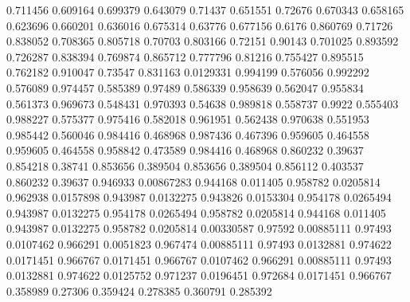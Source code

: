 0.711456 0.609164
0.699379 0.643079
0.71437 0.651551
0.72676 0.670343
0.658165 0.623696
0.660201 0.636016
0.675314 0.63776
0.677156 0.6176
0.860769 0.71726
0.838052 0.708365
0.805718 0.70703
0.803166 0.72151
0.90143 0.701025
0.893592 0.726287
0.838394 0.769874
0.865712 0.777796
0.81216 0.755427
0.895515 0.762182
0.910047 0.73547
0.831163 0.0129331
0.994199 0.576056
0.992292 0.576089
0.974457 0.585389
0.97489 0.586339
0.958639 0.562047
0.955834 0.561373
0.969673 0.548431
0.970393 0.54638
0.989818 0.558737
0.9922 0.555403
0.988227 0.575377
0.975416 0.582018
0.961951 0.562438
0.970638 0.551953
0.985442 0.560046
0.984416 0.468968
0.987436 0.467396
0.959605 0.464558
0.959605 0.464558
0.958842 0.473589
0.984416 0.468968
0.860232 0.39637
0.854218 0.38741
0.853656 0.389504
0.853656 0.389504
0.856112 0.403537
0.860232 0.39637
0.946933 0.00867283
0.944168 0.011405
0.958782 0.0205814
0.962938 0.0157898
0.943987 0.0132275
0.943826 0.0153304
0.954178 0.0265494
0.943987 0.0132275
0.954178 0.0265494
0.958782 0.0205814
0.944168 0.011405
0.943987 0.0132275
0.958782 0.0205814
0.00330587 0.97592
0.00885111 0.97493
0.0107462 0.966291
0.0051823 0.967474
0.00885111 0.97493
0.0132881 0.974622
0.0171451 0.966767
0.0171451 0.966767
0.0107462 0.966291
0.00885111 0.97493
0.0132881 0.974622
0.0125752 0.971237
0.0196451 0.972684
0.0171451 0.966767
0.358989 0.27306
0.359424 0.278385
0.360791 0.285392
